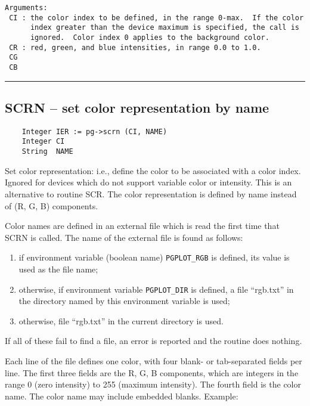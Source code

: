 \begin{verbatim}
Arguments:
 CI : the color index to be defined, in the range 0-max.  If the color
      index greater than the device maximum is specified, the call is
      ignored.  Color index 0 applies to the background color. 
 CR : red, green, and blue intensities, in range 0.0 to 1.0. 
 CG   
 CB
\end{verbatim}

\hrule

\subsection*{SCRN -- set color representation by name }

\begin{verbatim}
    Integer IER := pg->scrn (CI, NAME)
    Integer CI
    String  NAME
\end{verbatim}

Set color representation: i.e., define the color to be associated with
a color index.  Ignored for devices which do not support variable
color or intensity.  This is an alternative to routine SCR.  The color
representation is defined by name instead of (R, G, B) components.

Color names are defined in an external file which is read the first
time that SCRN is called.  The name of the external file is found as
follows:

\begin{enumerate}
\item if environment variable (boolean name) {\tt PGPLOT\_RGB} is
      defined, its value is used as the file name; 
\item otherwise, if environment variable {\tt PGPLOT\_DIR} is defined,
      a file ``rgb.txt'' in the directory named by this environment
      variable is used; 
\item otherwise, file ``rgb.txt'' in the current directory is used. 
\end{enumerate}

If all of these fail to find a file, an error is reported and the
routine does nothing.

Each line of the file defines one color, with four blank- or
tab-separated fields per line.  The first three fields are the R, G, B
components, which are integers in the range 0 (zero intensity) to 255
(maximum intensity).  The fourth field is the color name.  The color
name may include embedded blanks.  Example:

